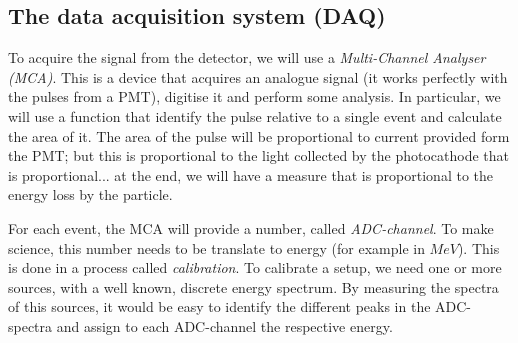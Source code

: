 \documentclass[a4,11pt, notitlepage]{article}
\begin{document}
%

\subsection{The data acquisition system (DAQ)}

To acquire the signal from the detector, we will use a \emph{Multi-Channel Analyser (MCA)}. 
This is a device that acquires an analogue signal (it works perfectly with the pulses from a PMT), digitise it and perform some analysis. 
In particular, we will use a function that identify the pulse relative to a single event and calculate the area of it. 
The area of the pulse will be proportional to current provided form the PMT; but this is proportional to the light collected by the photocathode that is proportional... 
at the end, we will have a measure that is proportional to the energy loss by the particle. 

For each event, the MCA will provide a number, called \emph{ADC-channel}. 
To make science, this number needs to be translate to energy (for example in $MeV$). 
This is done in a process called \emph{calibration}. 
To calibrate a setup, we need one or more sources, with a well known, discrete energy spectrum. 
By measuring the spectra of this sources, it would be easy to identify the different peaks in the ADC-spectra and assign to each ADC-channel the respective energy. 

\end{document}
